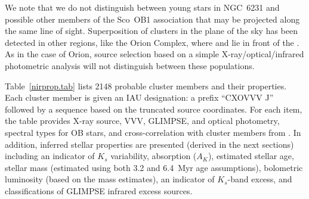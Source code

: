 \documentclass[twocolumn,tighten]{aastex61}
\begin{document}
We note that we do not distinguish between young stars in NGC~6231 and possible other members of the Sco~OB1 association that may be projected along the same line of sight. Superposition of clusters in the plane of the sky has been detected in other regions, like the Orion Complex, where  and   lie in front of the  \citep{2014A&A...564A..29B}. As in the case of Orion, source selection based on a simple X-ray/optical/infrared photometric analysis will not distinguish between these populations. 

Table~\ref{nirprop.tab} lists 2148 probable cluster members and their properties. Each cluster member is given an IAU designation: a prefix ``CXOVVV J'' followed by a sequence based on the truncated source coordinates. For each item, the table provides X-ray source, VVV, GLIMPSE, and optical photometry, spectral types for OB stars, and cross-correlation with cluster members from . In addition, inferred stellar properties are presented (derived in the next sections) including an indicator of $K_s$ variability, absorption ($A_K$), estimated stellar age, stellar mass (estimated using both 3.2 and 6.4~Myr age assumptions), bolometric luminosity (based on the mass estimates), an indicator of $K_s$-band excess, and classifications of GLIMPSE infrared excess sources. 
\end{document}
